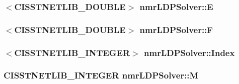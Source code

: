 \subsubsection[{E}]{$<$C\+I\+S\+S\+T\+N\+E\+T\+L\+I\+B\+\_\+\+D\+O\+U\+B\+L\+E$>$ nmr\+L\+D\+P\+Solver\+::\+E\hspace{0.3cm}{\ttfamily [protected]}}\label{classnmr_l_d_p_solver_a344c1e26e6c33572041e1260a3fe9365}
\hypertarget{classnmr_l_d_p_solver_a0b71d56e0b8a6bbf2f1111d07cf59d36}{}
\subsubsection[{F}]{$<$C\+I\+S\+S\+T\+N\+E\+T\+L\+I\+B\+\_\+\+D\+O\+U\+B\+L\+E$>$ nmr\+L\+D\+P\+Solver\+::\+F\hspace{0.3cm}{\ttfamily [protected]}}\label{classnmr_l_d_p_solver_a0b71d56e0b8a6bbf2f1111d07cf59d36}
\hypertarget{classnmr_l_d_p_solver_a5dcd4ece4fd96ef31855281ea0555762}{}
\subsubsection[{Index}]{$<$C\+I\+S\+S\+T\+N\+E\+T\+L\+I\+B\+\_\+\+I\+N\+T\+E\+G\+E\+R$>$ nmr\+L\+D\+P\+Solver\+::\+Index\hspace{0.3cm}{\ttfamily [protected]}}\label{classnmr_l_d_p_solver_a5dcd4ece4fd96ef31855281ea0555762}
\hypertarget{classnmr_l_d_p_solver_af5eac8148f7f7cc21c6a91f525875c47}{}
\subsubsection[{M}]{\setlength{\rightskip}{0pt plus 5cm}C\+I\+S\+S\+T\+N\+E\+T\+L\+I\+B\+\_\+\+I\+N\+T\+E\+G\+E\+R nmr\+L\+D\+P\+Solver\+::\+M\hspace{0.3cm}{\ttfamily [protected]}}\label{classnmr_l_d_p_solver_af5eac8148f7f7cc21c6a91f525875c47}
\hypertarget{classnmr_l_d_p_solver_abda6658672502493b5b4b28c0213d473}{}
